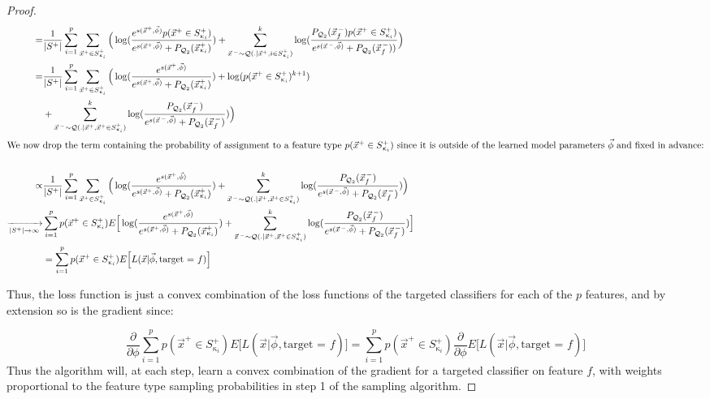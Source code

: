 \documentclass{article} %
\newcommand{\vect}[1]{\vec{#1}}
\DeclareMathOperator{\q}{{\mathcal{Q}}}
\begin{document}
\begin{proof}
\begin{align*}
=&  \frac{1}{|S^+|}\sum_{i=1}^p \sum_{\vect{x}^+ \in S^+_{\upkappa_i}} \Big( \log(\frac{e^{s(\vect{x}^+,\vec{\phi}) } p(\vect{x}^+ \in S^+_{\upkappa_i})}{e^{s(\vect{x}^+,\vec{\phi}) } + P_{\q_2}(\vect{x}^+_{\upkappa_i}) } ) + \sum_{\vect{x}^{\,-} \sim \q(.|\vect{x}^+,i\in S^+_{\upkappa_i})}^k \log(\frac{  P_{\q_2}(\vect{x}^{\,-}_{f})p(\vect{x}^+ \in S^+_{\upkappa_i})}{e^{s(\vect{x}^{\,-},\vec{\phi}) } + P_{\q_2}(\vect{x}^{\,-}_{f})) } \Big) \\
   = & \frac{1}{|S^+|}\sum_{i=1}^p \sum_{\vect{x}^+ \in S^+_{\upkappa_i}} \Big( \log(\frac{e^{s(\vect{x}^+,\vec{\phi}) }}{e^{s(\vect{x}^+,\vec{\phi}) } + P_{\q_2}(\vect{x}^+_{\upkappa_i}) }) + \log(p(\vect{x}^+ \in S^+_{\upkappa_i})^{k+1})\\
  &   +  \sum_{\vect{x}^{\,-} \sim \q(.|\vect{x}^+,\vect{x}^+ \in S^+_{\upkappa_i})}^k \log(\frac{ P_{\q_2}(\vect{x}^{\,-}_{f})}{e^{s(\vect{x}^{\,-},\vec{\phi}) } + P_{\q_2}(\vect{x}^{\,-}_{f})})   \Big) \\
\intertext{We now drop the term containing the probability of assignment to a feature type $p(\vect{x}^+ \in S^+_{\upkappa_i})$ since it is outside of the learned model parameters $\vec{\phi}$ and fixed in advance:}\\
    \propto & \frac{1}{|S^+|} \sum_{i=1}^p \sum_{\vect{x}^+ \in S^+_{\upkappa_i}} \Big( \log(\frac{e^{s(\vect{x}^+,\vec{\phi}) }}{e^{s(\vect{x}^+,\vec{\phi}) } + P_{\q_2}(\vect{x}^+_{\upkappa_i}) }) + \sum_{\vect{x}^{\,-} \sim \q(.|\vect{x}^+,\vect{x}^+ \in S^+_{\upkappa_i})}^k \log(\frac{ P_{\q_2}(\vect{x}^{\,-}_{f})}{e^{s(\vect{x}^{\,-},\vec{\phi}) } + P_{\q_2}(\vect{x}^{\,-}_{f})}) \Big) \\
    \xrightarrow[|S^+|\rightarrow \infty]{ }  & \sum_{i=1}^p p(\vect{x}^+ \in S^+_{\upkappa_i}) E\Big[ \log(\frac{e^{s(\vect{x}^+,\vec{\phi}) }}{e^{s(\vect{x}^+,\vec{\phi}) } + P_{\q_2}(\vect{x}^+_{\upkappa_i}) }) + \sum_{\vect{x}^{\,-} \sim \q(.|\vect{x}^+,\vect{x}^+ \in S^+_{\upkappa_i})}^k \log(\frac{ P_{\q_2}(\vect{x}^{\,-}_{f})}{e^{s(\vect{x}^{\,-},\vec{\phi}) } + P_{\q_2}(\vect{x}^{\,-}_{f})}) \Big] \\
   & = \sum_{i=1}^p p(\vect{x}^+ \in S^+_{\upkappa_i}) E\Big[ L(\vec{x} |\vec{\phi}, \text{target = $f$}) \Big]
\end{align*}

Thus, the loss function is just a convex combination  of the loss functions of the targeted classifiers for each of the $p$ features, and by extension so is the gradient since:

\[\frac{\partial }{\partial \phi}\sum_{i=1}^p p(\vect{x}^+ \in S^+_{\upkappa_i}) E\Big[ L(\vec{x} |\vec{\phi}, \text{target = $f$}) \Big] =
 \sum_{i=1}^p p(\vect{x}^+ \in S^+_{\upkappa_i}) \frac{\partial }{\partial \phi}E\Big[ L(\vec{x} |\vec{\phi}, \text{target = $f$}) \Big]\]
 Thus the algorithm will, at each step, learn a convex combination of the gradient for a targeted classifier on feature $f$, with weights proportional to the feature type sampling probabilities in step 1 of the sampling algorithm.
\end{proof}
\end{document}
